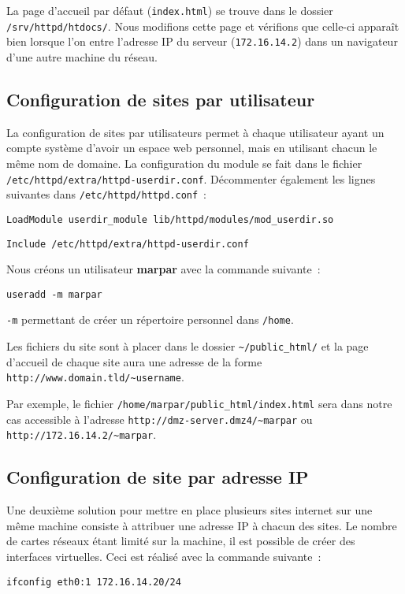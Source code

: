 \documentclass[11pt,a4paper,oneside]{article}
\newcommand{\inlinecode}{\lstinline[breaklines=true]}
\begin{document}
La page d'accueil par défaut (\inlinecode{index.html}) se trouve dans le dossier
\inlinecode{/srv/httpd/htdocs/}. Nous modifions cette page et vérifions que celle-ci
apparaît bien lorsque l'on entre l'adresse IP du serveur (\inlinecode{172.16.14.2})
dans un navigateur d'une autre machine du réseau.

\subsection{Configuration de sites par utilisateur}

La configuration de sites par utilisateurs permet à chaque utilisateur ayant un
compte système d'avoir un espace web personnel, mais en utilisant chacun le même
nom de domaine. La configuration du module se fait dans le fichier
\inlinecode{/etc/httpd/extra/httpd-userdir.conf}. Décommenter également les lignes
suivantes dans \inlinecode{/etc/httpd/httpd.conf}~:

\begin{lstlisting}
LoadModule userdir_module lib/httpd/modules/mod_userdir.so
\end{lstlisting}

\begin{lstlisting}
Include /etc/httpd/extra/httpd-userdir.conf
\end{lstlisting}

Nous créons un utilisateur \textbf{marpar} avec la commande suivante~:
\begin{lstlisting}
useradd -m marpar
\end{lstlisting}
\inlinecode{-m} permettant de créer un répertoire personnel dans
\inlinecode{/home}.

Les fichiers du site sont à placer dans le dossier
\inlinecode{~/public_html/} et la page d'accueil de chaque site aura une adresse de la
forme \inlinecode{http://www.domain.tld/~username}.

Par exemple, le fichier \inlinecode{/home/marpar/public_html/index.html} sera dans
notre cas accessible à l'adresse \inlinecode{http://dmz-server.dmz4/~marpar} ou
\inlinecode{http://172.16.14.2/~marpar}.

\subsection{Configuration de site par adresse IP}

Une deuxième solution pour mettre en place plusieurs sites internet sur une même
machine consiste à attribuer une adresse IP à chacun des sites. Le nombre de
cartes réseaux étant limité sur la machine, il est possible de créer des
interfaces virtuelles. Ceci est réalisé avec la commande suivante~:
\begin{lstlisting}
ifconfig eth0:1 172.16.14.20/24
\end{lstlisting}
\end{document}
